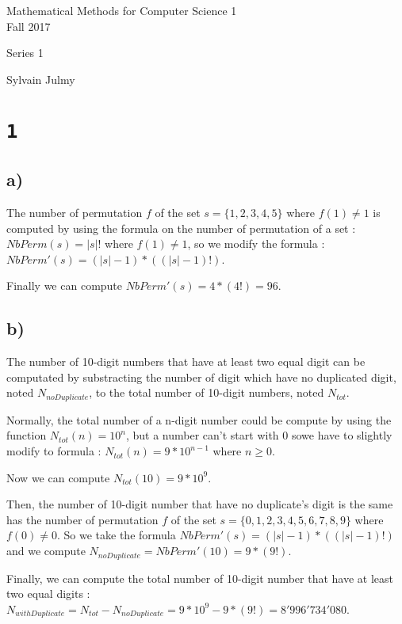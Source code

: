 \documentclass[a4paper,11pt]{report}
\author{Sylvain Julmy}
\date{\today}
\begin{document}
\begin{center}
  \Large{
    Mathematical Methods for Computer Science 1\\
    Fall 2017
  }
  \noindent\makebox[\linewidth]{\rule{\linewidth}{0.4pt}}

  Series 1
  \vspace*{1.4cm}

  Sylvain Julmy
  
  \noindent\makebox[\linewidth]{\rule{\linewidth}{0.4pt}}
\end{center}

\section*{\texttt{1}}
\subsection*{a)}

The number of permutation $f$ of the set $s = \{1,2,3,4,5\}$ where $f(1) \neq 1$
is computed by using the formula on the number of permutation of a set :
$NbPerm(s) = |s|!$ where $f(1) \neq 1$, so we modify the formula :
$NbPerm'(s) = (|s|-1) * ((|s|-1)!)$.

Finally we can compute $NbPerm'(s) = 4 * (4!) = 96.$

\subsection*{b)}

The number of 10-digit numbers that have at least two equal digit can be
computated by substracting the number of digit which have no duplicated digit,
noted $N_{noDuplicate}$, to the total number of 10-digit numbers, noted
$N_{tot}$.

Normally, the total number of a n-digit number could be compute by using the
function $N_{tot}(n) = 10^n$, but a number can't start with $0$ sowe have to
slightly modify to formula : $N_{tot}(n) = 9 *
10^{n-1}$ where $n \ge 0$.

Now we can compute $N_{tot}(10) = 9 * 10^9$.

Then, the number of 10-digit number that have no duplicate's digit is the same
has the number of permutation $f$ of the set $s = \{0,1,2,3,4,5,6,7,8,9\}$ where
$f(0) \neq 0$. So we take the formula $NbPerm'(s) = (|s|-1) * ((|s|-1)!)$ and
we compute $N_{noDuplicate} = NbPerm'(10) = 9 * (9!)$.

Finally, we can compute the total number of 10-digit number that have at least
two equal digits : $N_{withDuplicate} = N_{tot} - N_{noDuplicate} = 9 * 10^9 - 9
* (9!) = 8'996'734'080$.
\end{document}
